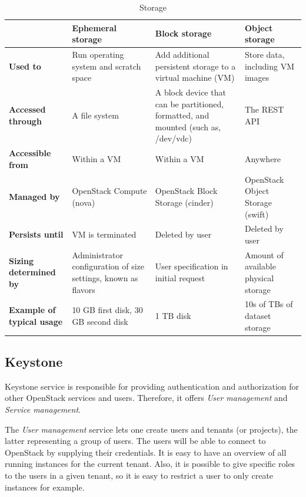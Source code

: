 \begin{table}[h]
	\centering
	\begin{tabular}{|m{2cm}|m{3.8cm}|m{3.8cm}|m{3.8cm}|}
		\hline
		 & 
		\textbf{Ephemeral \newline storage} & 
		\textbf{Block storage} & 
		\textbf{Object storage}\\
		\hline
		\textbf{Used to} & 
		Run operating system and scratch space & 
		Add additional persistent storage to a virtual machine (VM) & 
		Store data, including VM images \\
		\hline
		\textbf{Accessed through} & 
		A file system & 
		A block device that can be partitioned, formatted, and mounted (such as, /dev/vdc) & 
		The REST API \\
		\hline
		\textbf{Accessible from} & 
		Within a VM & 
		Within a VM & 
		Anywhere \\
		\hline
		\textbf{Managed by} & 
		OpenStack Compute (nova) & 
		OpenStack Block Storage (cinder) & 
		OpenStack Object Storage (swift) \\
		\hline
		\textbf{Persists until} & 
		VM is terminated & 
		Deleted by user & 
		Deleted by user \\
		\hline
		\textbf{Sizing determined by} & 
		Administrator configuration of size settings, known as flavors & 
		User specification in initial request & 
		Amount of available physical storage \\
		\hline
		\textbf{Example of typical usage} & 
		10 GB first disk, 30 GB second disk & 
		1 TB disk & 
		10s of TBs of dataset storage \\
		\hline
	\end{tabular}
	\caption{Storage \cite{stodec}}
	\label{table:storage_list}
\end{table}


\subsection{Keystone}
Keystone service is responsible for providing authentication and authorization for other OpenStack services and users. 
Therefore, it offers \textit{User management} and \textit{Service management}. 

The \textit{User management} service lets one create users and tenants (or projects), the latter representing a group of users. 
The users will be able to connect to OpenStack by supplying their credentials.
It is easy to have an overview of all running instances for the current tenant.
Also, it is possible to give specific roles to the users in a given tenant, so it is easy to restrict a user to only create instances for example. 

